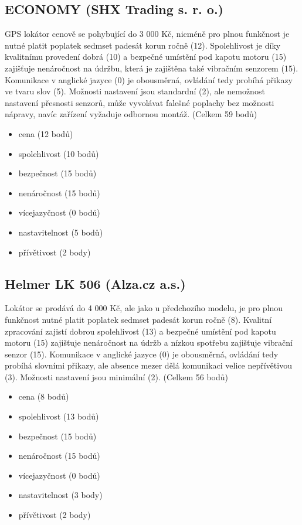 \documentclass[FM,BP]{tulthesis}  %
\begin{document}
\subsection{ECONOMY (SHX Trading s. r. o.)}
GPS lokátor cenově se pohybující do 3 000 Kč, nicméně pro plnou funkčnost je nutné platit poplatek sedmset padesát korun ročně (12). Spolehlivost je díky kvalitnímu provedení dobrá (10) a bezpečné umístění pod kapotu motoru (15) zajišťuje nenáročnost na údržbu, která je zajištěna také vibračním senzorem (15). Komunikace v anglické jazyce (0) je obousměrná, ovládání tedy probíhá přikazy ve tvaru slov (5). Možnosti nastavení jsou standardní (2), ale nemožnost nastavení přesnosti senzorů, může vyvolávat falešné poplachy bez možnosti nápravy, navíc zařízení vyžaduje odbornou montáž. (Celkem 59 bodů)

\begin{itemize}
\item cena (12 bodů)
\item spolehlivost (10 bodů)
\item bezpečnost (15 bodů)
\item nenáročnost (15 bodů)
\item vícejazyčnost (0 bodů)
\item nastavitelnost (5 bodů)
\item přívětivost (2 body)
\end{itemize}

\subsection{Helmer LK 506 (Alza.cz a.s.)}
Lokátor se prodává do 4 000 Kč, ale jako u předchozího modelu, je pro plnou funkčnost nutné platit poplatek sedmset padesát korun ročně (8). Kvalitní zpracování zajistí dobrou spolehlivost (13) a bezpečné umístění pod kapotu motoru (15) zajišťuje nenáročnost na údržb a nízkou spotřebu zajišťuje vibrační senzor (15). Komunikace v anglické jazyce (0) je obousměrná, ovládání tedy probíhá slovními přikazy, ale absence mezer dělá komunikaci velice nepřívětivou (3). Možnosti nastavení jsou minimální (2). (Celkem 56 bodů)

\begin{itemize}
\item cena (8 bodů)
\item spolehlivost (13 bodů)
\item bezpečnost (15 bodů)
\item nenáročnost (15 bodů)
\item vícejazyčnost (0 bodů)
\item nastavitelnost (3 body)
\item přívětivost (2 body)
\end{itemize}
\end{document}
